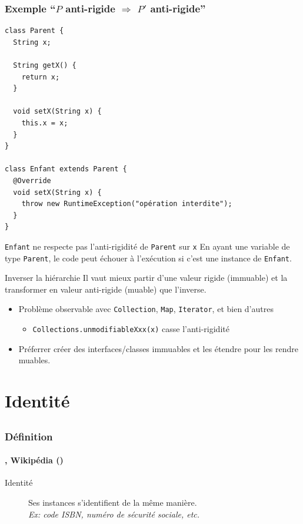 \documentclass[draft]{beamer}
\DeclareRobustCommand{\todo}[1]{\ifdraft{\textbf{\textcolor{red}{[#1]}}}{}}
\newcommand{\citecustom}[2]{#2 (\citeyear{#1})}
\begin{document}
\begin{frame}
\frametitle{Exemple ``$P$ anti-rigide $\Rightarrow$ $P'$ anti-rigide''}
\begin{lstlisting}
class Parent {
  String x;
  
  String getX() {
    return x;
  }
  
  void setX(String x) {
    this.x = x;
  }
}

class Enfant extends Parent {
  @Override
  void setX(String x) {
    throw new RuntimeException("opération interdite");
  }
}
\end{lstlisting}
\pagebreak
\begin{alertblock}{\lstinline{Enfant} ne respecte pas l'anti-rigidité de \lstinline{Parent} sur \lstinline{x}}
 En ayant une variable de type \lstinline{Parent}, le code peut échouer à l'exécution si c'est une instance de \lstinline{Enfant}.
\end{alertblock}
\begin{exampleblock}{Inverser la hiérarchie}
 Il vaut mieux partir d'une valeur rigide (immuable) et la transformer en valeur anti-rigide (muable) que l'inverse.
\end{exampleblock}
\begin{itemize}
 \item Problème observable avec \lstinline{Collection}, \lstinline{Map}, \lstinline{Iterator}, et bien d'autres
 \begin{itemize}
  \item \lstinline{Collections.unmodifiableXxx(x)} casse l'anti-rigidité
 \end{itemize}
 \item Préferrer créer des interfaces/classes immuables et les étendre pour les rendre muables.
\end{itemize}

\end{frame}

\section{Identité}
\subsection{}

\begin{frame}
\frametitle{Définition}
\framesubtitle{\cite{goos_ontological_2000,staab_overview_2004}, \citecustom{noauthor_ontoclean_2019}{Wikipédia}}
\begin{description}
 \item[Identité] Ses instances s'identifient de la même manière.\\
      {\footnotesize\textit{Ex: code ISBN, numéro de sécurité sociale, etc.}}
\end{description}
\todo{...}
\end{frame}
\end{document}
